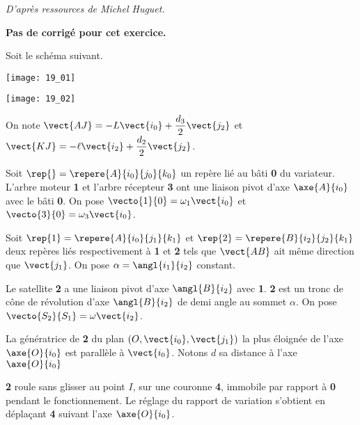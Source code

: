 \normalfalse \difficilefalse \tdifficiletrue
\correctionfalse


\begin{flushright}
\textit{D'après ressources de Michel Huguet.}
\end{flushright}
\setcounter{numques}{0}
\ifcorrection
\else
\textbf{Pas de corrigé pour cet exercice.}
\fi

\ifprof
\else

Soit le schéma suivant. 
\begin{center}
\texttt{[image: 19\_01]}

\texttt{[image: 19\_02]}
\end{center}

On note
$\vect{AJ}=-L \vect{i_0}+\dfrac{d_3}{2}\vect{j_2}$
et 
$\vect{KJ}=-\ell \vect{i_2}+\dfrac{d_2}{2}\vect{j_2}$.

Soit $\rep{}=\repere{A}{i_0}{j_0}{k_0}$ un repère lié au bâti \textbf{0} du variateur. L’arbre moteur \textbf{1} et l’arbre récepteur
\textbf{3} ont une liaison pivot d’axe $\axe{A}{i_0}$ avec le bâti \textbf{0}. On pose $\vecto{1}{0}=\omega_1\vect{i_0}$ et $\vecto{3}{0}=\omega_3\vect{i_0}$. 

Soit $\rep{1}=\repere{A}{i_0}{j_1}{k_1}$  et $\rep{2}=\repere{B}{i_2}{j_2}{k_1}$ deux repères liés respectivement à \textbf{1} et \textbf{2} tels que $\vect{AB}$ ait même direction que  $\vect{j_1}$. On pose $\alpha =  \angl{i_1}{i_2}$ constant. 

Le satellite \textbf{2} a une liaison pivot d’axe $\angl{B}{i_2}$ avec \textbf{1}. \textbf{2} est un tronc de cône de
révolution d’axe $\angl{B}{i_2}$ de demi angle au sommet $\alpha$. On pose $\vecto{S_2}{S_1}=\omega\vect{i_2}$.

La génératrice de \textbf{2} du plan $\left(O,\vect{i_0},\vect{j_1} \right)$  la plus éloignée de l’axe $\axe{O}{i_0}$
 est parallèle à $\vect{i_0}$. Notons $d$ sa distance à l’axe $\axe{O}{i_0}$

\textbf{2} roule sans glisser au point $I$, sur une couronne \textbf{4}, immobile par rapport à \textbf{0} pendant le
fonctionnement. Le réglage du rapport de variation s’obtient en déplaçant \textbf{4} suivant l’axe
$\axe{O}{i_0}$.

